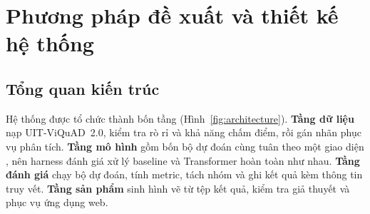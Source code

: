\bigskip
\section{Phương pháp đề xuất và thiết kế hệ thống}
\label{sec:method}

\subsection{Tổng quan kiến trúc}

Hệ thống được tổ chức thành bốn tầng (Hình~\ref{fig:architecture}). \textbf{Tầng dữ
liệu} nạp UIT-ViQuAD~2.0, kiểm tra rò rỉ và khả năng chấm điểm, rồi gán nhãn phục vụ
phân tích. \textbf{Tầng mô hình} gồm bốn bộ dự đoán cùng tuân theo một giao diện
, nên harness đánh giá xử lý baseline
và Transformer hoàn toàn như nhau. \textbf{Tầng đánh giá} chạy bộ dự đoán, tính metric,
tách nhóm và ghi kết quả kèm thông tin truy vết. \textbf{Tầng sản phẩm} sinh hình vẽ từ
tệp kết quả, kiểm tra giả thuyết và phục vụ ứng dụng web.

